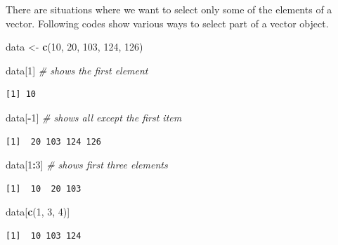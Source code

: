 \documentclass[]{book}
\newenvironment{Shaded}{\begin{snugshade}}{\end{snugshade}}
\newcommand{\CommentTok}[1]{\textcolor[rgb]{0.56,0.35,0.01}{\textit{#1}}}
\newcommand{\DecValTok}[1]{\textcolor[rgb]{0.00,0.00,0.81}{#1}}
\newcommand{\KeywordTok}[1]{\textcolor[rgb]{0.13,0.29,0.53}{\textbf{#1}}}
\newcommand{\NormalTok}[1]{#1}
\newcommand{\OperatorTok}[1]{\textcolor[rgb]{0.81,0.36,0.00}{\textbf{#1}}}
\newcommand{\StringTok}[1]{\textcolor[rgb]{0.31,0.60,0.02}{#1}}
\begin{document}
There are situations where we want to select only some of the elements of a vector. Following codes show various ways to select part of a vector object.

\begin{Shaded}
\begin{Highlighting}[]
\NormalTok{data <-}\StringTok{ }\KeywordTok{c}\NormalTok{(}\DecValTok{10}\NormalTok{, }\DecValTok{20}\NormalTok{, }\DecValTok{103}\NormalTok{, }\DecValTok{124}\NormalTok{, }\DecValTok{126}\NormalTok{)}

\NormalTok{data[}\DecValTok{1}\NormalTok{] }\CommentTok{# shows the first element }
\end{Highlighting}
\end{Shaded}

\begin{verbatim}
[1] 10
\end{verbatim}

\begin{Shaded}
\begin{Highlighting}[]
\NormalTok{data[}\OperatorTok{-}\DecValTok{1}\NormalTok{] }\CommentTok{# shows all except the first item}
\end{Highlighting}
\end{Shaded}

\begin{verbatim}
[1]  20 103 124 126
\end{verbatim}

\begin{Shaded}
\begin{Highlighting}[]
\NormalTok{data[}\DecValTok{1}\OperatorTok{:}\DecValTok{3}\NormalTok{] }\CommentTok{# shows first three elements}
\end{Highlighting}
\end{Shaded}

\begin{verbatim}
[1]  10  20 103
\end{verbatim}

\begin{Shaded}
\begin{Highlighting}[]
\NormalTok{data[}\KeywordTok{c}\NormalTok{(}\DecValTok{1}\NormalTok{, }\DecValTok{3}\NormalTok{, }\DecValTok{4}\NormalTok{)]}
\end{Highlighting}
\end{Shaded}

\begin{verbatim}
[1]  10 103 124
\end{verbatim}
\end{document}
